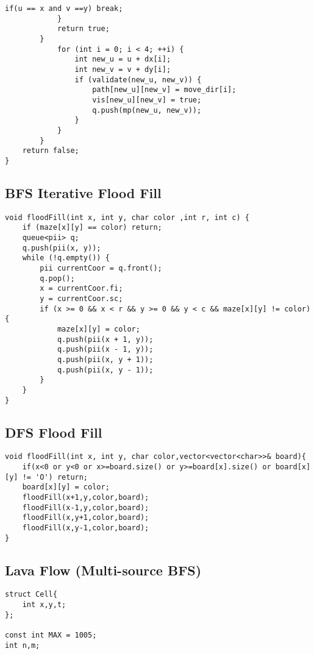 \documentclass[10pt]{article}
\begin{document}
\begin{multicols*}{2}
\begin{lstlisting}[style=compactcpp]
				if(u == x and v ==y) break;
			}
			return true;
		}
            for (int i = 0; i < 4; ++i) {
                int new_u = u + dx[i];
                int new_v = v + dy[i];
                if (validate(new_u, new_v)) {
                    path[new_u][new_v] = move_dir[i];
                    vis[new_u][new_v] = true;
                    q.push(mp(new_u, new_v));
                }
            }
        }
    return false;
}
\end{lstlisting}

\subsection{BFS Iterative Flood Fill}

\begin{lstlisting}[style=compactcpp]
void floodFill(int x, int y, char color ,int r, int c) {
	if (maze[x][y] == color) return;
	queue<pii> q;
	q.push(pii(x, y));
    while (!q.empty()) {
        pii currentCoor = q.front();
        q.pop();
        x = currentCoor.fi;
        y = currentCoor.sc;
        if (x >= 0 && x < r && y >= 0 && y < c && maze[x][y] != color) {
            maze[x][y] = color;
            q.push(pii(x + 1, y));
            q.push(pii(x - 1, y));
            q.push(pii(x, y + 1));
            q.push(pii(x, y - 1));
        }
    }
}
\end{lstlisting}

\subsection{DFS Flood Fill}

\begin{lstlisting}[style=compactcpp]
void floodFill(int x, int y, char color,vector<vector<char>>& board){
    if(x<0 or y<0 or x>=board.size() or y>=board[x].size() or board[x][y] != 'O') return;
    board[x][y] = color;
    floodFill(x+1,y,color,board);
    floodFill(x-1,y,color,board);
    floodFill(x,y+1,color,board);
    floodFill(x,y-1,color,board);
}
\end{lstlisting}

\subsection{Lava Flow (Multi-source BFS)}

\begin{lstlisting}[style=compactcpp]
    struct Cell{
    int x,y,t;
};
 
const int MAX = 1005;
int n,m;
 

\end{lstlisting}
\end{multicols*}
\end{document}
